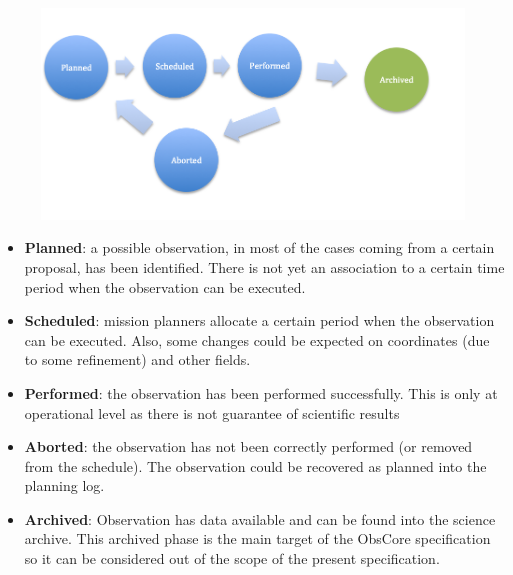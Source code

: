 \documentclass[11pt,a4paper]{ivoa}
\begin{document}
\begin{figure}[H]
\advance\leftskip 0.0in		\hfill\includegraphics{./media/observations_workflow.png}\hfill\strut%
\end{figure}

\begin{itemize}
	\item \textbf{Planned}: a possible observation, in most of the cases coming from a certain proposal, has been identified. There is not yet an association to a certain time period when the observation can be executed. \par

	\item \textbf{Scheduled}: mission planners allocate a certain period when the observation can be executed. Also, some changes could be expected on coordinates (due to some refinement) and other fields.\par

	\item \textbf{Performed}: the observation has been performed successfully. This is only at operational level as there is not guarantee of scientific results\par

	\item \textbf{Aborted}: the observation has not been correctly performed (or removed from the schedule). The observation could be recovered as planned into the planning log.\par

	\item \textbf{Archived}: Observation has data available and can be found into the science archive. This archived phase is the main target of the ObsCore specification so it can be considered out of the scope of the present specification.
\end{itemize}
\end{document}
